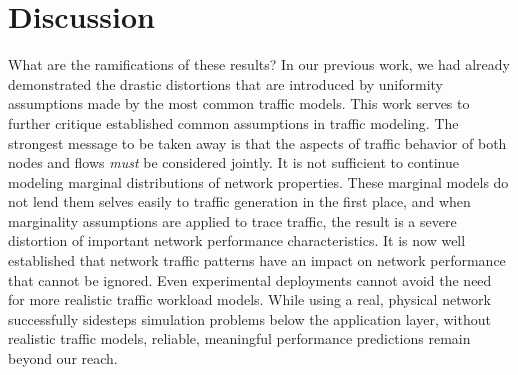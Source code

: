 \documentclass[twocolumn,final]{svjour3}
\newcommand{\caps}[1]{{\smaller{#1}}}
\begin{document}

\section{Discussion}\label{sec:discussion}


What are the ramifications of these results? In our previous work, we had already demonstrated the drastic distortions that are introduced by uniformity assumptions made by the most common traffic models. This work serves to further critique established common assumptions in traffic modeling. The strongest message to be taken away is that the aspects of traffic behavior of both nodes and flows \textit{must} be considered jointly. It is not sufficient to continue modeling marginal distributions of network properties. These marginal models do not lend them selves easily to traffic generation in the first place, and when marginality assumptions are applied to trace traffic, the result is a severe distortion of important network performance characteristics. It is now well established that network traffic patterns have an impact on network performance that cannot be ignored. Even experimental deployments cannot avoid the need for more realistic traffic workload models. While using a real, physical network successfully sidesteps simulation problems below the application layer, without realistic traffic models, reliable, meaningful performance predictions remain beyond our reach.


\end{document}

